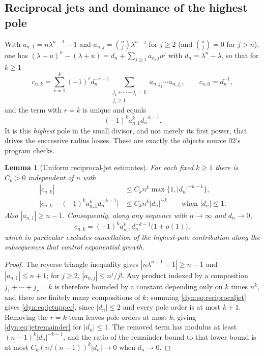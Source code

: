 \documentclass[11pt,letterpaper]{article}
\newtheorem{lemma}[lemma]{Lemma}
\theoremstyle{definition}
\theoremstyle{remark}
\numberwithin{equation}{section}
\begin{document}
\subsection{Reciprocal jets and dominance of the highest pole}
With $a_{n,1}=n\lambda^{n-1}-1$ and $a_{n,j}=\binom nj\lambda^{n-j}$ for
$j\ge2$ (and $\binom nj=0$ for $j>n$), one has
$(\lambda+u)^{n}-(\lambda+u)=d_n+\sum_{j\ge1}a_{n,j}u^{j}$ with
$d_n=\lambda^{n}-\lambda$, so that for $k\ge1$
\begin{equation}\label{dyn:eq:reciprocaljet}
 c_{n,k}=\sum_{r=1}^{k}(-1)^{r}d_n^{-r-1}
 \sum_{\substack{j_1+\cdots+j_r=k\\ j_i\ge1}}a_{n,j_1}\cdots a_{n,j_r},
 \qquad c_{n,0}=d_n^{-1},
\end{equation}
and the term with $r=k$ is unique and equals
\begin{equation}\label{dyn:eq:highestpole}
 (-1)^{k}a_{n,1}^{k}d_n^{-k-1}.
\end{equation}
It is this \emph{highest} pole in the small divisor, and not merely its
first power, that drives the successive radius losses. These are exactly the
objects source 02's program checks.

\begin{lemma}[Uniform reciprocal-jet estimates]\label{dyn:lem:jets}
For each fixed $k\ge1$ there is $C_k>0$ independent of $n$ with
\begin{align}
 |c_{n,k}|&\le C_kn^{k}\max\{1,|d_n|^{-k-1}\},\label{dyn:eq:jetupper}\\
 \bigl|c_{n,k}-(-1)^{k}a_{n,1}^{k}d_n^{-k-1}\bigr|
 &\le C_kn^{k}|d_n|^{-k}\qquad\text{when }|d_n|\le1.\label{dyn:eq:jetremainder}
\end{align}
Also $|a_{n,1}|\ge n-1$. Consequently, along any sequence with
$n\to\infty$ and $d_n\to0$,
\begin{equation}\label{dyn:eq:jetasymptotic}
 c_{n,k}=(-1)^{k}a_{n,1}^{k}d_n^{-k-1}\bigl(1+o(1)\bigr),
\end{equation}
which in particular \emph{excludes} cancellation of the highest-pole
contribution along the subsequences that control exponential growth.
\end{lemma}
\begin{proof}
The reverse triangle inequality gives $|n\lambda^{n-1}-1|\ge n-1$ and
$|a_{n,1}|\le n+1$; for $j\ge2$, $|a_{n,j}|\le n^{j}/j!$. Any product
indexed by a composition $j_1+\cdots+j_r=k$ is therefore bounded by a
constant depending only on $k$ times $n^{k}$, and there are finitely many
compositions of $k$; summing \eqref{dyn:eq:reciprocaljet} gives
\eqref{dyn:eq:jetupper}, since $|d_n|\le2$ and every pole order is at most
$k+1$. Removing the $r=k$ term leaves pole orders at most $k$, giving
\eqref{dyn:eq:jetremainder} for $|d_n|\le1$. The removed term has modulus
at least $(n-1)^{k}|d_n|^{-k-1}$, and the ratio of the remainder bound to
that lower bound is at most $C_k(n/(n-1))^{k}|d_n|\to0$ when $d_n\to0$.
\end{proof}
\end{document}
